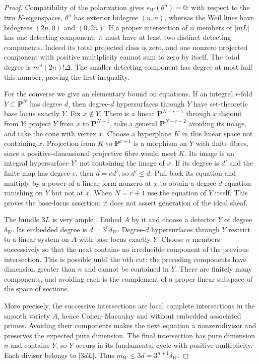 \documentclass[11pt]{article}
\theoremstyle{definition}
\theoremstyle{remark}
\begin{document}
\begin{proof}
Compatibility of the polarization gives $e_W(\theta^n)=0$: with respect to the two $K$-eigenspaces, $\theta^n$ has exterior bidegree $(n,n)$, whereas the Weil lines have bidegrees $(2n,0)$ and $(0,2n)$. If a proper intersection of $n$ members of $|mL|$ has one detecting component, it must have at least two distinct detecting components. Indeed its total projected class is zero, and one nonzero projected component with positive multiplicity cannot sum to zero by itself. The total degree is $m^n(2n)!\Delta$. The smaller detecting component has degree at most half this number, proving the first inequality.

For the converse we give an elementary bound on equations. If an integral $r$-fold $Y\subset\mathbf P^N$ has degree $d$, then degree-$d$ hypersurfaces through $Y$ have set-theoretic base locus exactly $Y$. Fix $x\notin Y$. There is a linear $\mathbf P^{N-r-1}$ through $x$ disjoint from $Y$: project $Y$ from $x$ to $\mathbf P^{N-1}$, take a general $\mathbf P^{N-r-2}$ avoiding its image, and take the cone with vertex $x$. Choose a hyperplane $K$ in this linear space not containing $x$. Projection from $K$ to $\mathbf P^{r+1}$ is a morphism on $Y$ with finite fibres, since a positive-dimensional projective fibre would meet $K$. Its image is an integral hypersurface $Y'$ not containing the image of $x$. If its degree is $d'$ and the finite map has degree $e$, then $d=ed'$, so $d'\leq d$. Pull back its equation and multiply by a power of a linear form nonzero at $x$ to obtain a degree-$d$ equation vanishing on $Y$ but not at $x$. When $N=r+1$ use the equation of $Y$ itself. This proves the base-locus assertion; it does not assert generation of the ideal sheaf.

The bundle $3L$ is very ample \cite[Remark~7.3, p.~12]{MilneAV}. Embed $A$ by it and choose a detector $Y$ of degree $\delta_W$. Its embedded degree is $d=3^n\delta_W$. Degree-$d$ hypersurfaces through $Y$ restrict to a linear system on $A$ with base locus exactly $Y$. Choose $n$ members successively so that the next contains no irreducible component of the previous intersection. This is possible until the $n$th cut: the preceding components have dimension greater than $n$ and cannot be contained in $Y$. There are finitely many components, and avoiding each is the complement of a proper linear subspace of the space of sections.

More precisely, the successive intersections are local complete intersections in the smooth variety $A$, hence Cohen--Macaulay and without embedded associated primes. Avoiding their components makes the next equation a nonzerodivisor and preserves the expected pure dimension. The final intersection has pure dimension $n$ and contains $Y$, so $Y$ occurs in its fundamental cycle with positive multiplicity. Each divisor belongs to $|3dL|$. Thus $m_W\leq3d=3^{n+1}\delta_W$.
\end{proof}
\end{document}
